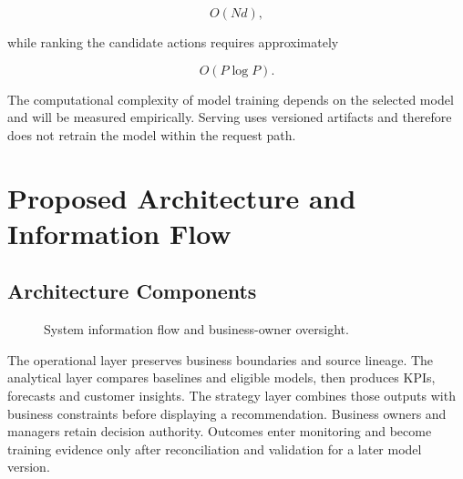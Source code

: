 \documentclass[a4paper,11pt,oneside]{book}
\theoremstyle{plain}
\theoremstyle{definition}
\theoremstyle{remark}
\begin{document}
\begin{equation}
O(Nd),
\label{eq:validation_complexity}
\end{equation}

while ranking the candidate actions requires approximately

\begin{equation}
O(P\log P).
\label{eq:ranking_complexity}
\end{equation}

The computational complexity of model training depends on the selected model and
will be measured empirically. Serving uses versioned artifacts and therefore
does not retrain the model within the request path.


\section{Proposed Architecture and Information Flow}
\label{sec:architecture_information_flow}


\subsection{Architecture Components}
\begin{figure}[H]
\centering
{}
\caption{System information flow and business-owner oversight.}
\label{fig:bsmartarchitecture}
\end{figure}
The operational layer preserves business boundaries and source lineage.
The analytical layer compares baselines and eligible models, then produces
KPIs, forecasts and customer insights. The strategy layer combines those
outputs with business constraints before displaying a recommendation.
Business owners and managers retain decision authority. Outcomes enter monitoring and become
training evidence only after reconciliation and validation for a later
model version.
\end{document}
